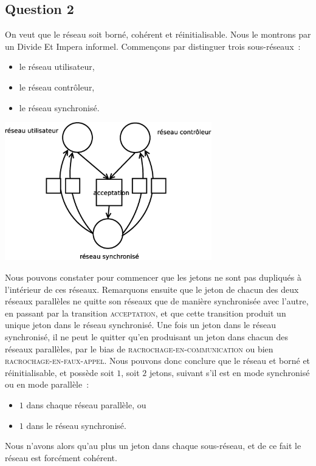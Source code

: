 \subsection*{Question 2}

On veut que le réseau soit borné, cohérent et réinitialisable. Nous le
montrons par un Divide Et Impera informel. Commençons par distinguer
trois sous-réseaux~:
\begin{itemize}
\item le réseau utilisateur,
\item le réseau contrôleur,
\item le réseau synchronisé.
\end{itemize}

\begin{center}
\includegraphics[width=9cm]{schemaexo2.eps}
\end{center}

Nous pouvons constater pour commencer que les jetons ne sont pas
dupliqués à l'intérieur de ces réseaux. Remarquons ensuite que le
jeton de chacun des deux réseaux parallèles ne quitte son réseaux
que de manière synchronisée avec l'autre, en passant par la transition
\textsc{acceptation}, et que cette transition produit un unique jeton
dans le réseau synchronisé.
Une fois un jeton dans le réseau synchronisé, il ne peut le quitter
qu'en produisant un jeton dans chacun des réseaux parallèles, par le
bias de \textsc{racrochage-en-communication} ou bien
\textsc{racrochage-en-faux-appel}.
Nous pouvons donc conclure que le réseau et borné et réinitialisable,
et possède soit $1$, soit $2$ jetons, suivant s'il est en mode synchronisé ou en mode parallèle~:
\begin{itemize}
\item $1$ dans chaque réseau parallèle, ou 
\item $1$ dans le réseau synchronisé.
\end{itemize} 
Nous n'avons alors qu'au plus un jeton dans chaque sous-réseau, et de
ce fait le réseau est forcément cohérent.


